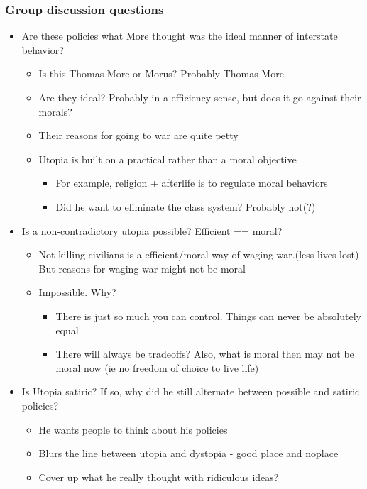 \documentclass[11pt]{article}
\begin{document}
\subsubsection{Group discussion questions}
\label{sec:org0cf27ec}
\begin{itemize}
\item Are these policies what More thought was the ideal manner of interstate behavior?
\begin{itemize}
\item Is this Thomas More or Morus? Probably Thomas More
\item Are they ideal? Probably in a efficiency sense, but does it go against their morals?
\item Their reasons for going to war are quite petty
\item Utopia is built on a practical rather than a moral objective
\begin{itemize}
\item For example, religion + afterlife is to regulate moral behaviors
\item Did he want to eliminate the class system? Probably not(?)
\end{itemize}
\end{itemize}
\item Is a non-contradictory utopia possible? Efficient == moral?
\begin{itemize}
\item Not killing civilians is a efficient/moral way of waging war.(less lives lost) But reasons for waging war might not be moral
\item Impossible. Why?
\begin{itemize}
\item There is just so much you can control. Things can never be absolutely equal
\item There will always be tradeoffs? Also, what is moral then may not be moral now (ie no freedom of choice to live life)
\end{itemize}
\end{itemize}
\item Is Utopia satiric? If so, why did he still alternate between possible and satiric policies?
\begin{itemize}
\item He wants people to think about his policies
\item Blurs the line between utopia and dystopia - good place and noplace
\item Cover up what he really thought with ridiculous ideas?
\end{itemize}
\end{itemize}
\end{document}
